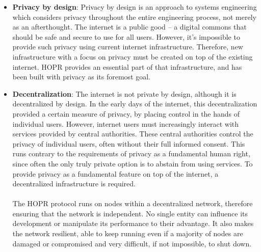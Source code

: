 \begin{itemize}

    \item \textbf{Privacy by design}: Privacy by design is an approach to systems engineering which
        considers privacy throughout the entire engineering process, not merely as an afterthought. The internet is a public good –
        a digital commons that should be safe and secure to use for all users.
        However, it's impossible to provide such privacy using current
        internet infrastructure. Therefore, new infrastructure with a focus
        on privacy must be created on top of the existing internet. HOPR provides an essential part of that infrastructure, and has been built with privacy as its foremost goal.

    \item \textbf{Decentralization}: The internet is not private by design, although it is decentralized by design. In the early days of the internet, this decentralization provided a certain measure of privacy, by placing control in the hands of individual users. 
        However, internet users must increasingly interact with services provided by central
        authorities. These central authorities control the privacy of individual users, often without their full informed consent. This runs contrary to the requirements of privacy as a fundamental human right, since often the only truly private option is to abstain from using services. To provide privacy as a fundamental feature on top of the internet, a decentralized infrastructure is required.
        \\~\\The HOPR protocol runs on nodes within a decentralized network,
        therefore ensuring that the network is independent. No single
        entity can influence its development or manipulate its performance to
        their advantage. It also makes the network resilient, able to keep
        running even if a majority of nodes are damaged or compromised and very
        difficult, if not impossible, to shut down.


\end{itemize}
